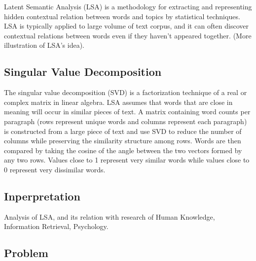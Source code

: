 Latent Semantic Analysis (LSA) is a methodology for extracting and representing hidden contextual relation between words and topics by statistical techniques\cite{landauer1998introduction}. LSA is typically applied to large volume of text corpus, and it can often discover contextual relations between words even if they haven't appeared together. (More illustration of LSA's idea). 

\subsection{Singular Value Decomposition}
The singular value decomposition (SVD) is a factorization technique of a real or complex matrix in linear algebra. LSA assumes that words that are close in meaning will occur in similar pieces of text. A matrix containing word counts per paragraph (rows represent unique words and columns represent each paragraph) is constructed from a large piece of text and use SVD to reduce the number of columns while preserving the similarity structure among rows. Words are then compared by taking the cosine of the angle between the two vectors formed by any two rows. Values close to 1 represent very similar words while values close to 0 represent very dissimilar words. \cite{dumais1995latent}

\subsection{Inperpretation}
Analysis of LSA, and its relation with research of Human Knowledge, Information Retrieval, Psychology.

\subsection{Problem}

